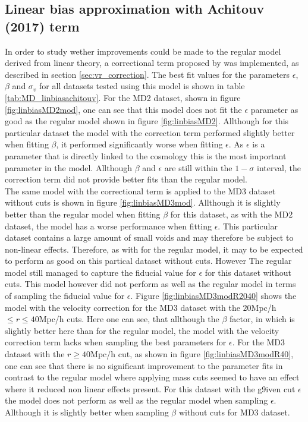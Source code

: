 \subsection{Linear bias approximation with Achitouv (2017) term}
In order to study wether improvements could be made to the regular model derived from linear theory, a correctional term proposed by \cite{Achitouv_streaming} was implemented, as described in section \ref{sec:vr_correction}. The best fit values for the parameters $\epsilon$, $\beta$ and $\sigma_v$ for all datasets tested using this model is shown in table \ref{tab:MD_linbiasachitouv}. For the MD2 dataset, shown in figure \ref{fig:linbiasMD2mod}, one can see that this model does not fit the $\epsilon$ parameter as good as the regular model shown in figure \ref{fig:linbiasMD2}. Allthough for this particular dataset the model with the correction term performed slightly better when fitting $\beta$, it performed significantly worse when fitting $\epsilon$. As $\epsilon$ is a  parameter that is directly linked to the cosmology this is the most important parameter in the model. Allthough $\beta$ and $\epsilon$ are still within the $1-\sigma$ interval, the correction term did not provide better fits than the regular model.\\\indent
The same model with the correctional term is applied to the MD3 dataset without cuts is shown in figure \ref{fig:linbiasMD3mod}. Allthough it is slightly better than the regular model when fitting $\beta$ for this dataset, as with the MD2 dataset, the model has a worse performance when fitting $\epsilon$. This particular dataset contains a large amount of small voids and may therefore be subject to non-linear effects. Therefore, as with for the regular model, it may to be expected to perform as good on this partical dataset without cuts. However The regular model still managed to 
capture the fiducial value for $\epsilon$ for this dataset without cuts. This model however did not perform as well as the regular model in terms of sampling the fiducial value for $\epsilon$.
Figure \ref{fig:linbiasMD3modR2040} shows the model with the velocity correction for the MD3 dataset with the $20$Mpc/h$\leq r\leq 40$Mpc/h cuts. Here one can see, that allthough the $\beta$ factor, in which is slightly better here than for the regular model, the model with the velocity correction term lacks when sampling the best parameters for $\epsilon$. For the MD3 dataset with the $r \geq 40$Mpc/h cut, as shown in figure \ref{fig:linbiasMD3modR40}, one can see that there is no significant improvement to the parameter fits in contrast to the regular model where applying mass cuts seemed to have an effect where it reduced non linear effects present. For this dataset with the g9iven cut $\epsilon$ the model does not perform as well as the regular model when sampling $\epsilon$. Allthough it is slightly better when sampling $\beta$ without cuts for MD3 dataset.

